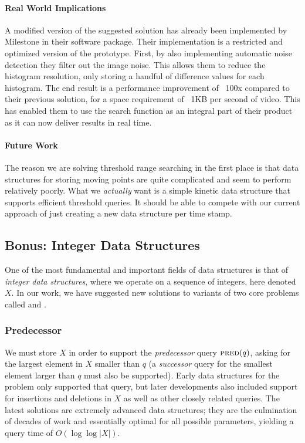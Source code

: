 \paragraph{Real World Implications} 
A modified version of the suggested solution has already been implemented by Milestone in their software package. Their implementation is a restricted and optimized version of the prototype. First, by also implementing automatic noise detection they filter out the image noise. This allows them to reduce the histogram resolution, only storing a handful of difference values for each histogram. The end result is a performance improvement of ~100x compared to their previous solution, for a space requirement of ~1KB per second of video. This has enabled them to use the search function as an integral part of their product as it can now deliver results in real time.


\paragraph{Future Work}
The reason we are solving threshold range searching in the first place is that data structures for storing moving points are quite complicated and seem to perform relatively poorly.
What we \emph{actually} want is a simple kinetic data structure that supports efficient threshold queries. It should be able to compete with our current approach of just creating a new data structure per time stamp.


\clearpage
\subsection{Bonus: Integer Data Structures}
One of the most fundamental and important fields of data structures is that of \emph{integer data structures}, where we operate on a sequence of integers, here denoted $X$. In our work, we have suggested new solutions to variants of two core problems called  and .


\clearpage
\subsubsection{Predecessor}
We must store $X$ in order to support the \emph{predecessor} query $\textsc{pred}(q)$, asking for the largest element in $X$ smaller than $q$ (a \emph{successor} query for the smallest element larger than $q$ must also be supported). Early data structures for the problem only supported that query, but later developments also included support for insertions and deletions in $X$ as well as other closely related queries. The latest solutions are extremely advanced data structures; they are the culmination of decades of work and essentially optimal for all possible parameters, yielding a query time of $O(\log \log |X|)$. 

